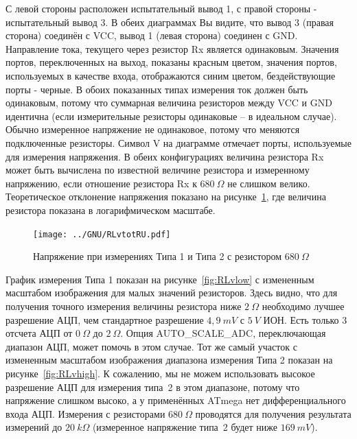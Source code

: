 С левой стороны расположен испытательный вывод 1, с правой стороны - испытательный вывод 3. В обеих диаграммах 
Вы видите, что вывод 3 (правая сторона) соединён с VCC, вывод 1 (левая сторона) соединен с GND. Направление тока, 
текущего через резистор Rx является одинаковым. Значения  портов, переключенных на выход, показаны красным цветом, 
значения портов, используемых в качестве входа, отображаются синим цветом, бездействующие порты - черные. В обоих 
показанных типах измерения ток должен быть одинаковым, потому что суммарная величина резисторов между VCC и GND 
идентична (если измерительные резисторы одинаковые – в идеальном случае). Обычно измеренное напряжение не 
одинаковое, потому что меняются подключенные резисторы. 
Символ V на диаграмме отмечает порты, используемые для измерения напряжения. В обеих конфигурациях величина 
резистора Rx может быть вычислена по известной величине резистора и измеренному напряжению, если отношение 
резистора Rx к \(680~\Omega\) не слишком велико. Теоретическое отклонение напряжения показано на 
рисунке~\ref{fig:RLvtot}, где величина резистора показана в логарифмическом масштабе.
\begin{figure}[H]
\centering
\texttt{[image: ../GNU/RLvtotRU.pdf]}
\caption{Напряжение при измерениях Типа 1 и Типа 2 с резистором \(680~\Omega\) }
\label{fig:RLvtot}
\end{figure}
График  измерения Типа 1 показан  на  рисунке~\ref{fig:RLvlow} с измененным масштабом изображения для малых 
значений резисторов. Здесь видно, что для получения точного измерения величины резистора ниже \(2~\Omega\)
необходимо лучшее разрешение АЦП, чем стандартное разрешение \(4,9~mV\) с \(5~V\) ИОН.  Есть только 3 отсчета 
АЦП от \(0~\Omega\) до \(2~\Omega\).
Опция AUTO\_SCALE\_ADC, переключающая диапазон АЦП, может помочь в этом случае. Тот же самый участок с измененным 
масштабом изображения диапазона измерения Типа 2 показан на рисунке~\ref{fig:RLvhigh}.
К сожалению, мы не можем использовать высокое разрешение АЦП для измерения типа~2 в этом диапазоне, потому что 
напряжение слишком высоко, а у применённых ATmega нет дифференциального входа АЦП. Измерения с 
резисторами \(680~\Omega\) проводятся для получения результата измерений до \(20~k\Omega\)
(измеренное напряжение типа~2 будет ниже \(169~mV\)).

